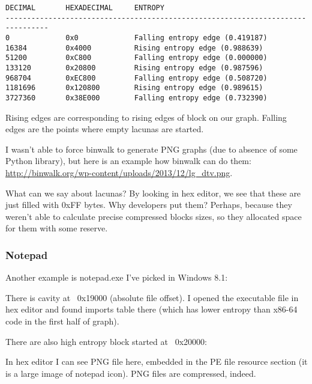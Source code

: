 \begin{lstlisting}
DECIMAL       HEXADECIMAL     ENTROPY
--------------------------------------------------------------------------------
0             0x0             Falling entropy edge (0.419187)
16384         0x4000          Rising entropy edge (0.988639)
51200         0xC800          Falling entropy edge (0.000000)
133120        0x20800         Rising entropy edge (0.987596)
968704        0xEC800         Falling entropy edge (0.508720)
1181696       0x120800        Rising entropy edge (0.989615)
3727360       0x38E000        Falling entropy edge (0.732390)
\end{lstlisting}

Rising edges are corresponding to rising edges of block on our graph.
Falling edges are the points where empty lacunas are started.

I wasn't able to force binwalk to generate PNG graphs (due to absence of some Python library), but here is an example how binwalk
can do them: \url{http://binwalk.org/wp-content/uploads/2013/12/lg_dtv.png}.

What can we say about lacunas? By looking in hex editor, we see that these are just filled with 0xFF bytes.
Why developers put them? Perhaps, because they weren't able to calculate precise compressed blocks sizes, so they allocated space
for them with some reserve.

\subsubsection{Notepad}


Another example is notepad.exe I've picked in Windows 8.1:

\begin{figure}[H]
\centering
{}
\end{figure}

There is cavity at ~0x19000 (absolute file offset).
I opened the executable file in hex editor and found imports table there (which has lower entropy than x86-64 code
in the first half of graph).

There are also high entropy block started at ~0x20000:

\begin{figure}[H]
\centering
{}
\end{figure}

In hex editor I can see PNG file here, embedded in the PE file resource section (it is a large image of notepad icon).
PNG files are compressed, indeed.

